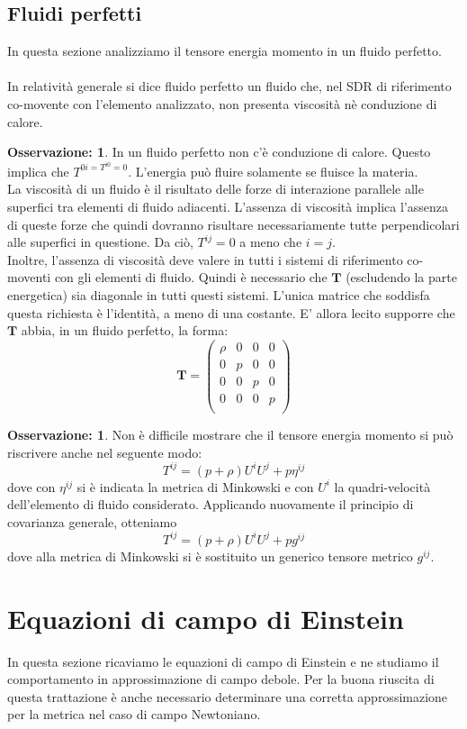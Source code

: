 \documentclass[]{report}
\theoremstyle{definition}
\theoremstyle{Theorem}
\theoremstyle{definition}
\theoremstyle{definition}
\theoremstyle{definition}
\newtheorem{Obs}[Def]{Osservazione:}
\begin{document}
\subsection{Fluidi perfetti}
In questa sezione analizziamo il tensore energia momento in un fluido perfetto.\\
\\
In relatività generale si dice fluido perfetto un fluido che, nel SDR di riferimento co-movente con l'elemento analizzato, non presenta viscosità nè conduzione di calore.
\begin{Obs}
	In un fluido perfetto non c'è conduzione di calore. Questo implica che $T^{0i=T^{i0}=0}$. L'energia può fluire solamente se fluisce la materia.\\
	La viscosità di un fluido è il risultato delle forze di interazione parallele alle superfici tra elementi di fluido adiacenti. L'assenza di viscosità implica l'assenza di queste forze che quindi dovranno risultare necessariamente tutte perpendicolari alle superfici in questione. Da ciò, $T^{ij}=0$ a meno che $i=j$.\\
	Inoltre, l'assenza di viscosità deve valere in tutti i sistemi di riferimento co-moventi con gli elementi di fluido. Quindi è necessario che $\textbf{T}$ (escludendo la parte energetica) sia diagonale in tutti questi sistemi. L'unica matrice che soddisfa questa richiesta è l'identità, a meno di una costante. E' allora lecito supporre che $\textbf{T}$ abbia, in un fluido perfetto, la forma:
	$$\textbf{T}=\begin{pmatrix}
		\rho & 0 & 0 &0\\
		0 & p & 0 &0\\
		0 & 0 & p &0\\
		0 & 0 & 0 &p\\
	\end{pmatrix}$$	
\end{Obs}
\begin{Obs}
	Non è difficile mostrare che il tensore energia momento si può riscrivere anche nel seguente modo:
	$$T^{ij}=(p+\rho)U^iU^j+p\eta^{ij}$$
	dove con $\eta^{ij}$ si è indicata la metrica di Minkowski e con $U^i$ la quadri-velocità dell'elemento di fluido considerato. Applicando nuovamente il principio di covarianza generale, otteniamo
	$$T^{ij}=(p+\rho)U^iU^j+pg^{ij}$$
	dove alla metrica di Minkowski si è sostituito un generico tensore metrico $g^{ij}$.
\end{Obs}
\section{Equazioni di campo di Einstein}
In questa sezione ricaviamo le equazioni di campo di Einstein e ne studiamo il comportamento in approssimazione di campo debole. Per la buona riuscita di questa trattazione è anche necessario determinare una corretta approssimazione per la metrica nel caso di campo Newtoniano.
\end{document}
